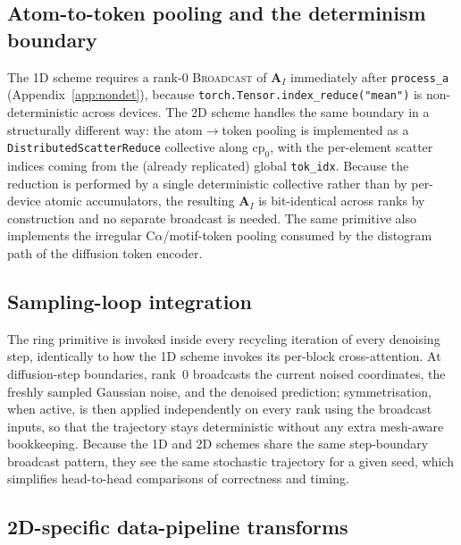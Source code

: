 \documentclass{article}
\theoremstyle{plain}
\theoremstyle{definition}
\theoremstyle{remark}
\begin{document}
\subsection{Atom-to-token pooling and the determinism boundary}
\label{app:2d-pooling}

The 1D scheme requires a rank-$0$ \textsc{Broadcast} of $\mathbf{A}_I$ immediately after \texttt{process\_a} (Appendix~\ref{app:nondet}), because \texttt{torch.Tensor.index\_reduce("mean")} is non-deterministic across devices. The 2D scheme handles the same boundary in a structurally different way: the atom$\to$token pooling is implemented as a \texttt{DistributedScatterReduce} collective along $\text{cp}_0$, with the per-element scatter indices coming from the (already replicated) global \texttt{tok\_idx}. Because the reduction is performed by a single deterministic collective rather than by per-device atomic accumulators, the resulting $\mathbf{A}_I$ is bit-identical across ranks by construction and no separate broadcast is needed. The same primitive also implements the irregular C$\alpha$/motif-token pooling consumed by the distogram path of the diffusion token encoder.

\subsection{Sampling-loop integration}
\label{app:2d-loop}

The ring primitive is invoked inside every recycling iteration of every denoising step, identically to how the 1D scheme invokes its per-block cross-attention. At diffusion-step boundaries, rank~$0$ broadcasts the current noised coordinates, the freshly sampled Gaussian noise, and the denoised prediction; symmetrisation, when active, is then applied independently on every rank using the broadcast inputs, so that the trajectory stays deterministic without any extra mesh-aware bookkeeping. Because the 1D and 2D schemes share the same step-boundary broadcast pattern, they see the same stochastic trajectory for a given seed, which simplifies head-to-head comparisons of correctness and timing.

\subsection{2D-specific data-pipeline transforms}
\label{app:2d-transforms}
\end{document}
